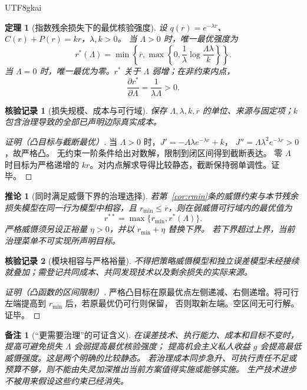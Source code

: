 \documentclass[12pt,a4paper,openany]{report}
\newtheorem{theorem}{定理}[chapter]
\newtheorem{corollary}{推论}[chapter]
\newtheorem{remark}{备注}[chapter]
\newtheorem{Certificate}{核验记录}[chapter]
\begin{document}
\begin{CJK*}{UTF8}{gkai}
\begin{theorem}[指数残余损失下的最优核验强度]
\label{thm:audit-optimum}
设 $q(r)=e^{-\lambda r}$、$C(r)+P(r)=kr$，$\lambda,k>0$。
当 $\Lambda>0$ 时，唯一最优强度为
\[
 r^*(\Lambda)=\min\left\{\overline r,
 \max\left\{0,\frac1\lambda\log\frac{\Lambda\lambda}{k}\right\}\right\}.
\]
当 $\Lambda=0$ 时，唯一最优为零。$r^*$ 关于 $\Lambda$ 弱增；在非约束内点，
\[
 \frac{\partial r^*}{\partial\Lambda}=\frac1{\lambda\Lambda}>0.
\]
\end{theorem}
\begin{Certificate}[损失规模、成本与可行域]
保存 $\Lambda,\lambda,k,\overline r$ 的单位、来源与固定项；$k$ 包含治理导致的全部已声明边际真实成本。
\end{Certificate}
\begin{proof}[证明（凸目标与截断最优）]
当 $\Lambda>0$ 时，$J'=-\Lambda\lambda e^{-\lambda r}+k$，
$J''=\Lambda\lambda^2e^{-\lambda r}>0$，故严格凸。
无约束一阶条件给出对数解，限制到闭区间得到截断表达。
零 $\Lambda$ 时目标为严格递增的 $kr$。对内点解求导得比较静态，截断保持弱单调性。证毕。
\end{proof}

\begin{corollary}[同时满足威慑下界的治理选择]
\label{cor:constrained-audit}
若第~\ref{cor:rmin}条的威慑约束与本节残余损失模型在同一行为模型中相容，且
$r_{\min}\le\overline r$，则在弱威慑可行域内的最优值为
\[
 r^{**}=\max\{r_{\min},r^*(\Lambda)\}.
\]
严格威慑须另设正裕量 $\eta>0$，并以 $r_{\min}+\eta$ 替换下界。
若下界超过上界，当前治理菜单不可实现所声明目标。
\end{corollary}
\begin{Certificate}[模块相容与严格裕量]
不得把策略威慑模型和独立误差模型未经接续就叠加；需登记共同成本、共同发现技术以及剩余损失的实际来源。
\end{Certificate}
\begin{proof}[证明（凸函数的区间限制）]
严格凸目标在原最优点左侧递减、右侧递增。将可行左端提高到 $r_{\min}$ 后，若原最优仍可行则保留，
否则取新左端。空区间无可行解。证毕。
\end{proof}

\begin{remark}[“更需要治理”的可证含义]
在误差技术、执行能力、成本和目标不变时，提高可避免损失 $\Lambda$ 会弱提高最优核验强度；
提高机会主义私人收益 $g$ 会提高最低威慑强度。这是两个明确的比较静态。
若治理成本同步急升、可执行责任不足或预算不够，则不能由失灵加深推出当前方案值得实施或能够实施。
生产技术进步不被用来假设这些约束已经消失。
\end{remark}


\end{CJK*}
\end{document}
